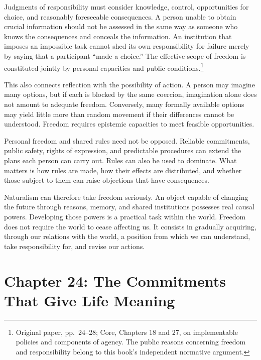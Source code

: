 \documentclass[
  english,
  11pt,
  oneside]{book}
\begin{document}
Judgments of responsibility must consider knowledge, control, opportunities for choice, and reasonably foreseeable consequences. A person unable to obtain crucial information should not be assessed in the same way as someone who knows the consequences and conceals the information. An institution that imposes an impossible task cannot shed its own responsibility for failure merely by saying that a participant ``made a choice.'' The effective scope of freedom is constituted jointly by personal capacities and public conditions.\footnote{\hypertarget{ph-note-55}{}Original paper, pp.~24--28; Core, Chapters 18 and 27, on implementable policies and components of agency. The public reasons concerning freedom and responsibility belong to this book's independent normative argument.}

This also connects reflection with the possibility of action. A person may imagine many options, but if each is blocked by the same coercion, imagination alone does not amount to adequate freedom. Conversely, many formally available options may yield little more than random movement if their differences cannot be understood. Freedom requires epistemic capacities to meet feasible opportunities.

Personal freedom and shared rules need not be opposed. Reliable commitments, public safety, rights of expression, and predictable procedures can extend the plans each person can carry out. Rules can also be used to dominate. What matters is how rules are made, how their effects are distributed, and whether those subject to them can raise objections that have consequences.

\begingroup{}

Naturalism can therefore take freedom seriously. An object capable of changing the future through reasons, memory, and shared institutions possesses real causal powers. Developing those powers is a practical task within the world. Freedom does not require the world to cease affecting us. It consists in gradually acquiring, through our relations with the world, a position from which we can understand, take responsibility for, and revise our actions.

\par\endgroup

\chapter{Chapter 24: The Commitments That Give Life Meaning}\label{ph-ch-24}
\end{document}
